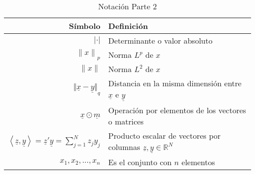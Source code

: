 \begin{table}[H]
    \begin{center}
        \begin{tabularx}{\textwidth}{|r|X|}
            \hline
            \textbf{Símbolo}                                                                                                     & \textbf{Definición}                                                                         \\
            \hline
            $ {\lvert \cdot \rvert} $                                                                                            & Determinante o valor absoluto                                                               \\
            $ {\lVert x \rVert}_{p} $                                                                                            & Norma $L^{p}$ de $x$                                                                        \\
            $ {\lVert x \rVert} $                                                                                                & Norma $L^{2}$ de $x$                                                                        \\
            $ {\Vert \underline{x} - \underline{y} \Vert}_{q} $                                                                  & Distancia en la misma dimensión entre $\underline{x}$ e $\underline{y}$                     \\
            $ \underline{x} \odot \underline{m} $                                                                                & Operación por elementos de los vectores o matrices                                          \\
            $ \left\langle \underline{z}, \underline{y} \right\rangle = \underline{z}' \underline{y} = \sum_{j=1}^{N}{z_j y_j} $ & Producto escalar de vectores por columnas $\underline{z}, \underline{y} \in \mathbb{R}^{N}$ \\
            $ {x_{1}, x_{2}, \ldots ,x_{n}} $                                                                                    & Es el conjunto con $n$ elementos                                                            \\
            \hline
        \end{tabularx}
        \caption{Notación Parte 2}
        \label{tab:nnotation-part-2}
    \end{center}
\end{table}


